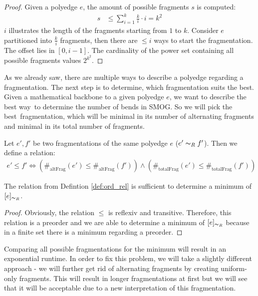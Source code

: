 \begin{proof}
	Given a polyedge $e$, the amount of possible fragments $s$ is computed:
	\begin{align*}
	s &\leq \sum_{i=1}^k \frac{k}{i} \cdot i = k^2
	\end{align*}
	$i$ illustrates the length of the fragments starting from $1$ to $k$. Consider $e$ partitioned into $\frac{k}{i}$ fragments, then there are $\leq i$ ways to start the fragmentation. The offset lies in $[0,i-1]$. The cardinality of the power set containing all possible fragments values $2^{k^2}$.
\end{proof}
As we already saw, there are multiple ways to describe a polyedge regarding a fragmentation. The next step is to determine, which fragmentation suits the best. Given a mathematical backbone to a given polyedge $e$, we want to describe the \grqq best way\grqq~to determine the number of bends in SMOG. So we will pick the \grqq best\grqq~fragmentation, which will be minimal in its number of alternating fragments and minimal in its total number of fragments.
\begin{definition}\label{def:ord_rel}
	Let $e',f'$ be two fragmentations of the same polyedge $e$ ($e' \thicksim_R f'$). Then we define a relation:
	\begin{align*}
	e' \leq f' \Leftrightarrow \left(\#_{\text{altFrag}}(e') \leq \#_{\text{altFrag}}(f')\right) \wedge \left(\#_{\text{totalFrag}}(e') \leq \#_{\text{totalFrag}}(f')\right)
	\end{align*}
\end{definition}
\begin{lemma}
	The relation from Defintion \ref{def:ord_rel} is sufficient to determine a minimum of $[e]_{\thicksim_R}$. 
\end{lemma}
\begin{proof}
	Obviously, the relation $\leq$ is reflexiv and transitive. Therefore, this relation is a preorder and we are able to determine a minimum of $[e]_{\thicksim_R}$ because in a finite set there is a minimum regarding a preorder.
\end{proof}
Comparing all possible fragmentations for the minimum will result in an exponential runtime. In order to fix this problem, we will take a slightly different approach - we will further get rid of alternating fragments by creating uniform-only fragments. This will result in longer fragmentations at first but we will see that it will be acceptable due to a new interpretation of this fragmentation.\\
